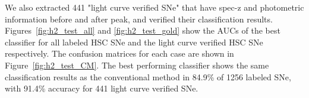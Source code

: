 \documentclass[useamsfonts]{pasj01}
\begin{document}
We also extracted 441 "light curve verified SNe" that have spec-z and photometric information before and after peak, and verified their classification results.
Figures\ \ref{fig:h2_test_all} and \ref{fig:h2_test_gold} show the AUCs of the best classifier for all labeled HSC SNe and the light curve verified HSC SNe respectively.
The confusion matrices for each case are shown in Figure\ \ref{fig:h2_test_CM}.
The best performing classifier shows the same classification results as the conventional method in 84.9\% of 1256 labeled SNe, with 91.4\% accuracy for 441 light curve verified SNe.
%
%
%
%
\end{document}
